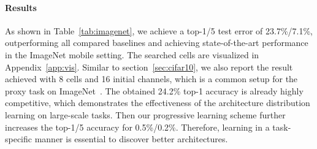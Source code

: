 \documentclass{article} \usepackage{iclr2021_conference,times}
\begin{document}
\paragraph{Results}
As shown in Table~\ref{tab:imagenet}, we achieve a top-1/5 test error of 23.7\%/7.1\%, outperforming all compared baselines and achieving state-of-the-art performance in the ImageNet mobile setting. The searched cells are visualized in Appendix~\ref{app:vis}.
Similar to section~\ref{sec:cifar10}, we also report the result achieved with 8 cells and 16 initial channels, which is a common setup for the proxy task on ImageNet~\citep{pcdarts}. The obtained 24.2\% top-1 accuracy is already highly competitive, which demonstrates the effectiveness of the architecture distribution learning on large-scale tasks. 
Then our progressive learning scheme further increases the top-1/5 accuracy for 0.5\%/0.2\%.
Therefore, learning in a task-specific manner is essential to discover better architectures.
\end{document}
